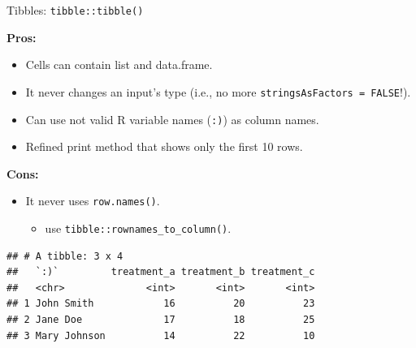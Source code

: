 \documentclass[14pt,ignorenonframetext,]{bredelebeamer}
\newenvironment{Shaded}{\begin{snugshade}}{\end{snugshade}}
\newcommand{\KeywordTok}[1]{\textcolor[rgb]{0.94,0.87,0.69}{#1}}
\newcommand{\DataTypeTok}[1]{\textcolor[rgb]{0.87,0.87,0.75}{#1}}
\newcommand{\StringTok}[1]{\textcolor[rgb]{0.80,0.58,0.58}{#1}}
\newcommand{\OperatorTok}[1]{\textcolor[rgb]{0.94,0.94,0.82}{#1}}
\newcommand{\NormalTok}[1]{\textcolor[rgb]{0.80,0.80,0.80}{#1}}
\providecommand{\tightlist}{%
  \setlength{\itemsep}{0pt}\setlength{\parskip}{0pt}}
\begin{document}
\begin{frame}[fragile]{Tibbles: \texttt{tibble::tibble()}}

\textbf{Pros: }

\begin{itemize}
\tightlist
\item
  Cells can contain list and data.frame.
\item
  It never changes an input's type (i.e., no more
  \texttt{stringsAsFactors\ =\ FALSE}!).
\item
  Can use not valid R variable names (\texttt{:)}) as column names.
\item
  Refined print method that shows only the first 10 rows.
\end{itemize}

\textbf{Cons: }

\begin{itemize}
\tightlist
\item
  It never uses \texttt{row.names()}.

  \begin{itemize}
  \tightlist
  \item
    use \texttt{tibble::rownames\_to\_column()}.
  \end{itemize}
\end{itemize}

\begin{Shaded}
\end{Shaded}

\begin{verbatim}
## # A tibble: 3 x 4
##   `:)`         treatment_a treatment_b treatment_c
##   <chr>              <int>       <int>       <int>
## 1 John Smith            16          20          23
## 2 Jane Doe              17          18          25
## 3 Mary Johnson          14          22          10
\end{verbatim}

\end{frame}
\end{document}
